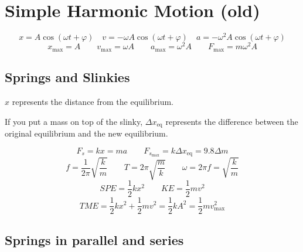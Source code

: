 \section{Simple Harmonic Motion (old)}

\[
	x = A \cos(\omega t + \varphi) \quad
	v = -\omega A \cos(\omega t + \varphi) \quad
	a = -\omega^2 A \cos(\omega t + \varphi)
\]
\[
	x_{\max} = A \qquad
	v_{\max} = \omega A \qquad
	a_{\max} = \omega^2 A \qquad
	F_{\max} = m\omega^2 A
\]

\subsection{Springs and Slinkies}

$x$ represents the distance from the equilibrium.

If you put a mass on top of the slinky, $\Delta x_\text{eq}$ represents the difference between the original equilibrium and the new equilibrium.

\[
	F_s = kx = ma \qquad
	F_{s_{\max}} = k\Delta x_\text{eq} = 9.8 \Delta m
\]
\[
	f = \frac{1}{2\pi}\sqrt{\frac{k}{m}} \qquad 
	T = 2\pi\sqrt{\frac{m}{k}} \qquad 
	\omega = 2\pi f = \sqrt{\frac{k}{m}}
\]
\[
	SPE = \frac{1}{2} kx^2 \qquad
	KE = \frac{1}{2} mv^2
\]
\[
	TME = \frac{1}{2} kx^2 + \frac{1}{2} mv^2 = \frac{1}{2} kA^2 = \frac{1}{2} mv_{\max}^2
\]

\subsection{Springs in parallel and series}


